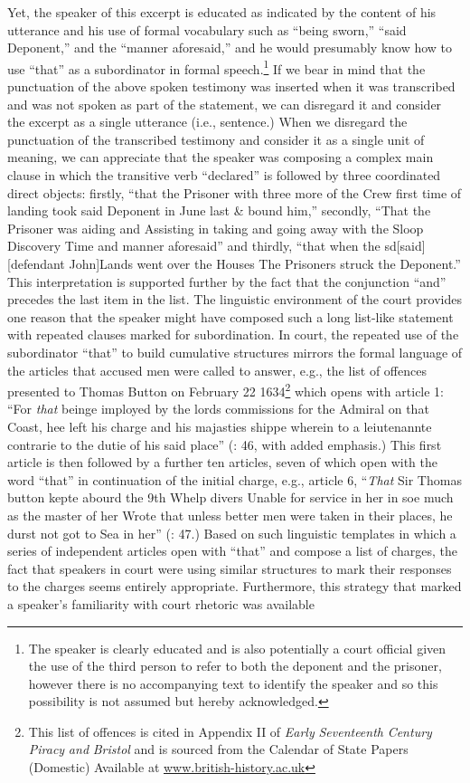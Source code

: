 Yet, the speaker of this excerpt is educated as indicated by the content of his utterance and his use of formal vocabulary such as “being sworn,” “said Deponent,” and the “manner aforesaid,” and he would presumably know how to use “that” as a subordinator in formal speech.\footnote{The speaker is clearly educated and is also potentially a court official given the use of the third person to refer to both the deponent and the prisoner, however there is no accompanying text to identify the speaker and so this possibility is not assumed but hereby acknowledged.} If we bear in mind that the punctuation of the above spoken testimony was inserted when it was transcribed and was not spoken as part of the statement, we can disregard it and consider the excerpt as a single utterance (i.e., sentence.) When we disregard the punctuation of the transcribed testimony and consider it as a single unit of meaning, we can appreciate that the speaker was composing a complex main clause in which the transitive verb “declared” is followed by three coordinated direct objects: firstly, “that the Prisoner with three more of the Crew first time of landing took said Deponent in June last \& bound him,” secondly, “That the Prisoner was aiding and Assisting in taking and going away with the Sloop Discovery Time and manner aforesaid” and thirdly, “that when the sd[said] [defendant John]Lands went over the Houses The Prisoners struck the Deponent.” This interpretation is supported further by the fact that the conjunction “and” precedes the last item in the list. The linguistic environment of the court provides one reason that the speaker might have composed such a long list-like statement with repeated clauses marked for subordination. In court, the repeated use of the subordinator “that” to build cumulative structures mirrors the formal language of the articles that accused men were called to answer, e.g., the list of offences presented to Thomas Button on February 22 1634\footnote{This list of offences is cited in Appendix II of \textit{Early} \textit{Seventeenth} \textit{Century} \textit{Piracy} \textit{and} \textit{Bristol} \citep[46-48]{Hill2013} and is sourced from the Calendar of State Papers (Domestic) Available at \href{http://www.british-history.ac.uk/}{{www.british-history.ac.uk}}} which opens with article 1: “For \textit{that} beinge imployed by the lords commissions for the Admiral on that Coast, hee left his charge and his majasties shippe wherein to a leiutenannte contrarie to the dutie of his said place” (\citealt{Hill2013}: 46, with added emphasis.) This first article is then followed by a further ten articles, seven of which open with the word “that” in continuation of the initial charge, e.g., article 6, “\textit{That} Sir Thomas button kepte abourd the 9th Whelp divers Unable for service in her in soe much as the master of her Wrote that unless better men were taken in their places, he durst not got to Sea in her” (\citealt{Hill2013}: 47.) Based on such linguistic templates in which a series of independent articles open with “that” and compose a list of charges, the fact that speakers in court were using similar structures to mark their responses to the charges seems entirely appropriate. Furthermore, this strategy that marked a speaker’s familiarity with court rhetoric was available 